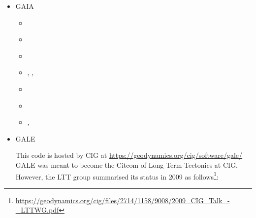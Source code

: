 \begin{itemize}
\begin{scriptsize}
\begin{itemize}
\item[\twothousandthirteen]  \textcite{vyrc13}
\item[\twothousandfourteen]  \textcite{alrk14}
\item[\twothousandseventeen] \textcite{jidb17}
\item[\twothousandtwenty]    \textcite{resi20}
\item[\twothousandtwentyone] \textcite{josv21}
\end{itemize}
\end{scriptsize}

\item {\codefont GAIA} 

\begin{scriptsize}
\begin{itemize}
\item[\twothousandeight]     \textcite{hust08b} 
\item[\twothousandeleven]    \textcite{toyu11} 
\item[\twothousandtwelve]    \textcite{nobs12}
\item[\twothousandthirteen]  \textcite{hutm13},  \textcite{plth13},  \textcite{nobr13} 
\item[\twothousandeighteen]  \textcite{plpt18}
\item[\twothousandnineteen]  \textcite{neum19}
\item[\twothousandtwenty]    \textcite{agtb20},  \textcite{sctp20}
\end{itemize}
\end{scriptsize}

\item {\codefont GALE} 

This code is hosted by CIG at \url{https://geodynamics.org/cig/software/gale/}
GALE was meant to become the Citcom of Long Term Tectonics at CIG. However, 
the LTT group summarised its status in 2009 as 
follows\footnote{\url{https://geodynamics.org/cig/files/2714/1158/9008/2009_CIG_Talk_-_LTTWG.pdf}}:


\end{itemize}
